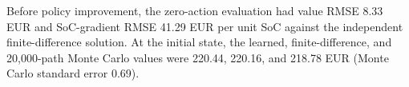 Before policy improvement, the zero-action evaluation had value RMSE 8.33 EUR and SoC-gradient RMSE 41.29 EUR per unit SoC against the independent finite-difference solution. At the initial state, the learned, finite-difference, and 20,000-path Monte Carlo values were 220.44, 220.16, and 218.78 EUR (Monte Carlo standard error 0.69).